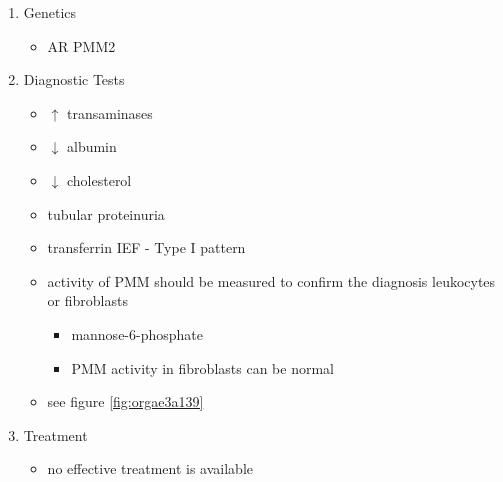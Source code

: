 \documentclass[12pt]{scrartcl}
\begin{document}
\begin{enumerate}
\begin{itemize}

\item GDP-mannose is used in the ER to assemble the dolichol-pyrophosphate
oligosaccharide precursor
\item defect leads to hypoglycosylation
\item deficiency and/or dysfunction of numerous glycoproteins:
\begin{itemize}
\item serum proteins:
\begin{itemize}
\item thyroxin-binding globulin, haptoglobin, clotting factor XI,
antithrombin III, cholinesterase
\end{itemize}
\item lysosomal enzymes
\item membrane bound glycoproteins
\end{itemize}
\end{itemize}

\item Genetics
\label{sec:org1299054}
\begin{itemize}
\item AR PMM2
\end{itemize}

\item Diagnostic Tests
\label{sec:org26a9810}
\begin{itemize}
\item \(\uparrow\) transaminases
\item \(\downarrow\) albumin
\item \(\downarrow\) cholesterol
\item tubular proteinuria
\item transferrin IEF - Type I pattern
\item activity of PMM should be measured to confirm the diagnosis
leukocytes or fibroblasts
\begin{itemize}
\item\relax [2-H\textsuperscript{3}]mannose-6-phosphate
\item PMM activity in fibroblasts can be normal
\end{itemize}
\item see figure \ref{fig:orgae3a139}
\end{itemize}

\item Treatment
\label{sec:org13dcf7f}
\begin{itemize}
\item no effective treatment is available
\end{itemize}
\end{enumerate}
\end{document}
